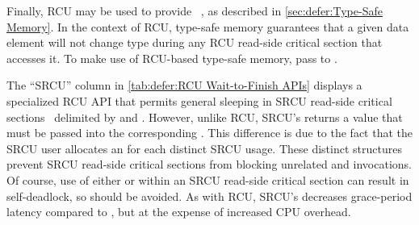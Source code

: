 Finally, RCU may be used to provide
~\cite{Cheriton96a}, as described in
\cref{sec:defer:Type-Safe Memory}.
In the context of RCU, type-safe memory guarantees that a given
data element will not change type during any RCU read-side critical section
that accesses it.
To make use of RCU-based type-safe memory, pass
 to .

The ``SRCU'' column in
\cref{tab:defer:RCU Wait-to-Finish APIs}
displays a specialized RCU API that permits general sleeping in SRCU
read-side critical
sections~\cite{PaulEMcKenney2006c}
delimited by  and .
However, unlike RCU, SRCU's  returns a value that
must be passed into the corresponding .
This difference is due to the fact that the SRCU user allocates an
 for each distinct SRCU usage.
These distinct  structures prevent SRCU read-side critical
sections from blocking unrelated  and
 invocations.
Of course, use of either  or
 within an SRCU read-side critical
section can result in self-deadlock, so should be avoided.
As with RCU, SRCU's  decreases
grace-period latency compared to , but at
the expense of increased CPU overhead.

\QuickQuizEnd

